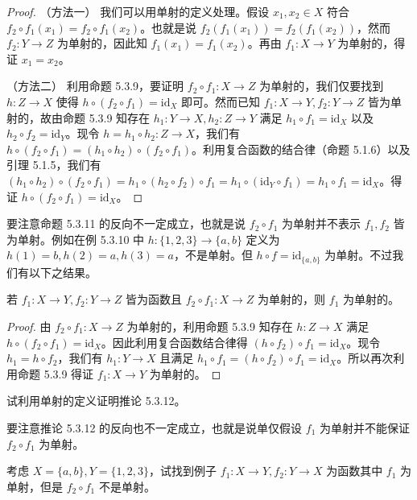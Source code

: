 \begin{proof}
（方法一） 我们可以用单射的定义处理。假设 $x_1, x_2 \in X$ 符合 $f_2 \circ f_1(x_1) = f_2 \circ f_1(x_2)$。也就是说 $f_2(f_1(x_1)) = f_2(f_1(x_2))$，然而 $f_2 : Y \to Z$ 为单射的，因此知 $f_1(x_1) = f_1(x_2)$。再由 $f_1 : X \to Y$ 为单射的，得证 $x_1 = x_2$。

（方法二） 利用命题 5.3.9，要证明 $f_2 \circ f_1 : X \to Z$ 为单射的，我们仅要找到 $h : Z \to X$ 使得 $h \circ (f_2 \circ f_1) = \mathrm{id}_X$ 即可。然而已知 $f_1 : X \to Y, f_2 : Y \to Z$ 皆为单射的，故由命题 5.3.9 知存在 $h_1 : Y \to X, h_2 : Z \to Y$ 满足 $h_1 \circ f_1 = \mathrm{id}_X$ 以及 $h_2 \circ f_2 = \mathrm{id}_Y$。现令 $h = h_1 \circ h_2 : Z \to X$，我们有 $h \circ (f_2 \circ f_1) = (h_1 \circ h_2) \circ (f_2 \circ f_1)$。利用复合函数的结合律（命题 5.1.6）以及引理 5.1.5，我们有 $(h_1 \circ h_2) \circ (f_2 \circ f_1) = h_1 \circ (h_2 \circ f_2) \circ f_1 = h_1 \circ (\mathrm{id}_Y \circ f_1) = h_1 \circ f_1 = \mathrm{id}_X$。得证 $h \circ (f_2 \circ f_1) = \mathrm{id}_X$。
\end{proof}

要注意命题 5.3.11 的反向不一定成立，也就是说 $f_2 \circ f_1$ 为单射并不表示 $f_1, f_2$ 皆为单射。例如在例 5.3.10 中 $h : \{1, 2, 3\} \to \{a, b\}$ 定义为 $h(1) = b, h(2) = a, h(3) = a$，不是单射。但 $h \circ f = \mathrm{id}_{\{a,b\}}$ 为单射。不过我们有以下之结果。

\begin{corollary}
若 $f_1 : X \to Y, f_2 : Y \to Z$ 皆为函数且 $f_2 \circ f_1 : X \to Z$ 为单射的，则 $f_1$ 为单射的。
\end{corollary}

\begin{proof}
由 $f_2 \circ f_1 : X \to Z$ 为单射的，利用命题 5.3.9 知存在 $h : Z \to X$ 满足 $h \circ (f_2 \circ f_1) = \mathrm{id}_X$。因此利用复合函数结合律得 $(h \circ f_2) \circ f_1 = \mathrm{id}_X$。现令 $h_1 = h \circ f_2$，我们有 $h_1 : Y \to X$ 且满足 $h_1 \circ f_1 = (h \circ f_2) \circ f_1 = \mathrm{id}_X$。所以再次利用命题 5.3.9 得证 $f_1 : X \to Y$ 为单射的。
\end{proof}

\begin{question}
试利用单射的定义证明推论 5.3.12。
\end{question}

要注意推论 5.3.12 的反向也不一定成立，也就是说单仅假设 $f_1$ 为单射并不能保证 $f_2 \circ f_1$ 为单射。

\begin{question}
考虑 $X = \{a, b\}, Y = \{1, 2, 3\}$，试找到例子 $f_1 : X \to Y, f_2 : Y \to X$ 为函数其中 $f_1$ 为单射，但是 $f_2 \circ f_1$ 不是单射。
\end{question}

